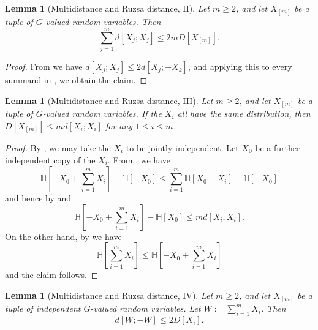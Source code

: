 \documentclass[10pt,a4paper]{article}
\newtheorem{lemma}[theorem]{Lemma}
\newcommand{\lean}[1]{}
\newcommand{\uses}[1]{}
\newcommand{\leanok}{}
\newcommand{\bbH}{\mathbb{H}}
\begin{document}
\begin{lemma}[Multidistance and Ruzsa distance, II]\label{multidist-ruzsa-II}\lean{multidist_ruzsa_II}\uses{multidist-def}\leanok
  Let $m \ge 2$, and let $X_{[m]}$ be a tuple of $G$-valued random variables. Then
  $$\sum_{j=1}^m d[X_j;X_j] \leq 2 m D[X_{[m]}].$$
\end{lemma}

\begin{proof}\uses{ruzsa-triangle,multidist-ruzsa-I}\leanok
From  we have $d[X_j;X_j] \leq 2 d[X_j;-X_k]$, and applying this to every summand in , we obtain the claim.
\end{proof}

\begin{lemma}[Multidistance and Ruzsa distance, III]\label{multidist-ruzsa-III}\lean{multidist_ruzsa_III}\uses{multidist-def}\leanok
  Let $m \ge 2$, and let $X_{[m]}$ be a tuple of $G$-valued random variables. If the $X_i$ all have the same distribution, then $D[X_{[m]}] \leq m d[X_i;X_i]$ for any $1 \leq i \leq m$.
\end{lemma}

\begin{proof}\uses{klm-1, neg-ent, ruz-indep, sumset-lower, ruz-copy, multidist-copy, multidist-indep}\leanok
  By ,  we may take the $X_i$ to be jointly independent.    Let $X_0$ be a further independent copy of the $X_i$.
From , we have
$$ \bbH[-X_0 + \sum_{i=1}^m X_i] - \bbH[-X_0] \leq \sum_{i=1}^m \bbH[X_0 - X_i] - \bbH[-X_0]$$
and hence by  and 
$$ \bbH[-X_0 + \sum_{i=1}^m X_i] - \bbH[X_0] \leq m d[X_i,X_i].$$
On the other hand, by  we have
$$ \bbH[\sum_{i=1}^m X_i] \leq \bbH[-X_0 + \sum_{i=1}^m X_i]$$
and the claim follows.
\end{proof}

\begin{lemma}[Multidistance and Ruzsa distance, IV]\label{multidist-ruzsa-IV}\lean{multidist_ruzsa_IV}\uses{multidist-def}\leanok
  Let $m \ge 2$, and let $X_{[m]}$ be a tuple of independent $G$-valued random variables.  Let $W := \sum_{i=1}^m X_i$. Then
  $$ d[W;-W] \leq 2 D[X_i].$$
\end{lemma}
\end{document}

